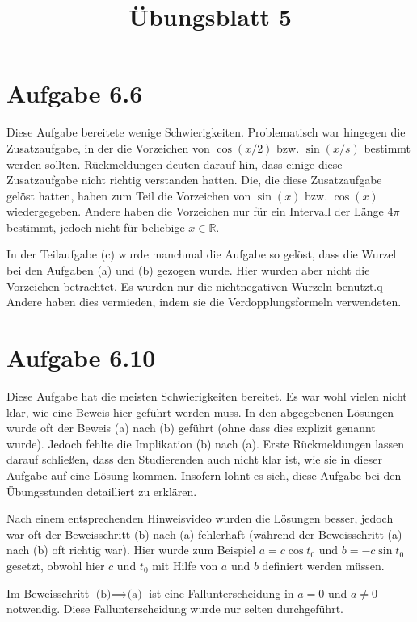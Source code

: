 \documentclass[a4paper]{article}
\title{Übungsblatt 5}
\date{}
\author{}
\newcommand*{\R}{\mathbb R}
\begin{document}
\maketitle

\section{Aufgabe 6.6}

Diese Aufgabe bereitete wenige Schwierigkeiten. Problematisch war hingegen die Zusatzaufgabe, in der die Vorzeichen von $\cos(x/2)$ bzw. $\sin(x/s)$ bestimmt werden sollten. Rückmeldungen deuten darauf hin, dass einige diese Zusatzaufgabe nicht richtig verstanden hatten. Die, die diese Zusatzaufgabe gelöst hatten, haben zum Teil die Vorzeichen von $\sin(x)$ bzw. $\cos(x)$ wiedergegeben. Andere haben die Vorzeichen nur für ein Intervall der Länge $4\pi$ bestimmt, jedoch nicht für beliebige $x\in\R$.

In der Teilaufgabe (c) wurde manchmal die Aufgabe so gelöst, dass die Wurzel bei den Aufgaben (a) und (b) gezogen wurde. Hier wurden aber nicht die Vorzeichen betrachtet. Es wurden nur die nichtnegativen Wurzeln benutzt.q Andere haben dies vermieden, indem sie die Verdopplungsformeln verwendeten.

\section{Aufgabe 6.10}

Diese Aufgabe hat die meisten Schwierigkeiten bereitet. Es war wohl vielen nicht klar, wie eine Beweis hier geführt werden muss. In den abgegebenen Lösungen wurde oft der Beweis (a) nach (b) geführt (ohne dass dies explizit genannt wurde). Jedoch fehlte die Implikation (b) nach (a). Erste Rückmeldungen lassen darauf schließen, dass den Studierenden auch nicht klar ist, wie sie in dieser Aufgabe auf eine Lösung kommen. Insofern lohnt es sich, diese Aufgabe bei den Übungsstunden detailliert zu erklären.

Nach einem entsprechenden Hinweisvideo wurden die Lösungen besser, jedoch war oft der Beweisschritt (b) nach (a) fehlerhaft (während der Beweisschritt (a) nach (b) oft richtig war). Hier wurde zum Beispiel $a=c \cos t_0$ und $b=-c\sin t_0$ gesetzt, obwohl hier $c$ und $t_0$ mit Hilfe von $a$ und $b$ definiert werden müssen.

Im Beweisschritt $\text{(b)} \implies \text{(a)}$ ist eine Fallunterscheidung in $a=0$ und $a\neq 0$ notwendig. Diese Fallunterscheidung wurde nur selten durchgeführt.
\end{document}
